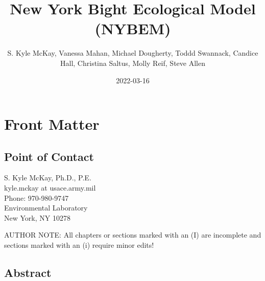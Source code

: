 \documentclass[
]{book}
\title{New York Bight Ecological Model (NYBEM)}
\author{S. Kyle McKay, Vanessa Mahan, Michael Dougherty, Toddd Swannack, Candice Hall, Christina Saltus, Molly Reif, Steve Allen}
\date{2022-03-16}
\begin{document}
\maketitle

{
\setcounter{tocdepth}{1}
\tableofcontents
}
\hypertarget{front-matter}{%
\chapter*{Front Matter}\label{front-matter}}

\hypertarget{point-of-contact}{%
\section*{Point of Contact}\label{point-of-contact}}

S. Kyle McKay, Ph.D., P.E.\\
kyle.mckay at usace.army.mil\\
Phone: 970-980-9747\\
Environmental Laboratory\\
New York, NY 10278

{AUTHOR NOTE: All chapters or sections marked with an (I) are incomplete and sections marked with an (i) require minor edits!}

\hypertarget{abstract}{%
\section*{Abstract}\label{abstract}}
\end{document}
